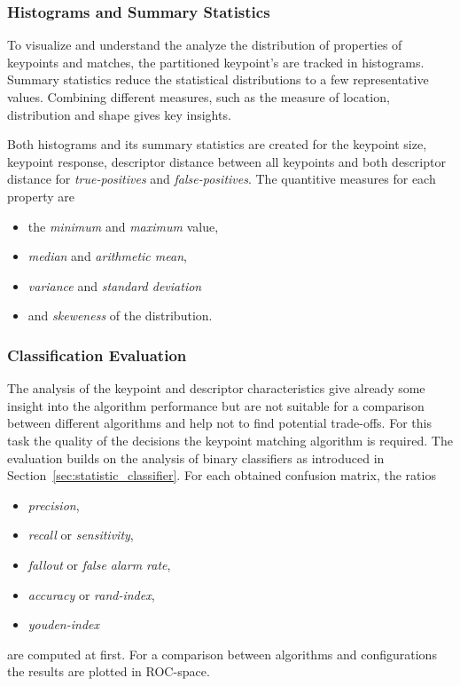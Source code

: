 \subsubsection{Histograms and Summary Statistics}

To visualize and understand the analyze the distribution of properties of keypoints and matches, the partitioned keypoint's are tracked in histograms.
Summary statistics reduce the statistical distributions to a few representative values.
Combining different measures, such as the measure of location, distribution and shape gives key insights.

Both histograms and its summary statistics are created for the keypoint size, keypoint response, descriptor distance between all keypoints and both descriptor distance for \emph{true-positives} and \emph{false-positives}.
The quantitive measures for each property are
\begin{itemize}
    \item the \emph{minimum} and \emph{maximum} value,
    \item \emph{median} and \emph{arithmetic mean},
    \item \emph{variance} and \emph{standard deviation}
    \item and \emph{skeweness} of the distribution.
\end{itemize}

\subsubsection{Classification Evaluation}

The analysis of the keypoint and descriptor characteristics give already some insight into the algorithm performance but are not suitable for a comparison between different algorithms and help not to find potential trade-offs.
For this task the quality of the decisions the keypoint matching algorithm is required.
The evaluation builds on the analysis of binary classifiers as introduced in Section~\ref{sec:statistic_classifier}.
For each obtained confusion matrix, the ratios
\begin{itemize}
    \item \emph{precision},
    \item \emph{recall} or \emph{sensitivity},
    \item \emph{fallout} or \emph{false alarm rate},
    \item \emph{accuracy} or \emph{rand-index},
    \item \emph{youden-index}
\end{itemize}
are computed at first.
For a comparison between algorithms and configurations the results are plotted in \gls{ROC}-space.

